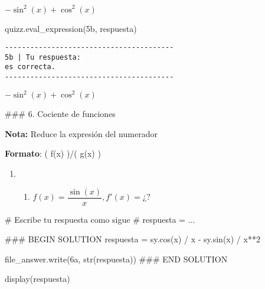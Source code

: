\documentclass[
  letterpaper,
  DIV=11,
  numbers=noendperiod]{scrreprt}
\newenvironment{Shaded}{\begin{snugshade}}{\end{snugshade}}
\newcommand{\BuiltInTok}[1]{\textcolor[rgb]{0.00,0.23,0.31}{#1}}
\newcommand{\CommentTok}[1]{\textcolor[rgb]{0.37,0.37,0.37}{#1}}
\newcommand{\DecValTok}[1]{\textcolor[rgb]{0.68,0.00,0.00}{#1}}
\newcommand{\NormalTok}[1]{\textcolor[rgb]{0.00,0.23,0.31}{#1}}
\newcommand{\OperatorTok}[1]{\textcolor[rgb]{0.37,0.37,0.37}{#1}}
\newcommand{\RegionMarkerTok}[1]{\textcolor[rgb]{0.00,0.23,0.31}{#1}}
\newcommand{\StringTok}[1]{\textcolor[rgb]{0.13,0.47,0.30}{#1}}
\providecommand{\tightlist}{%
  \setlength{\itemsep}{0pt}\setlength{\parskip}{0pt}}\usepackage{longtable,booktabs,array}
\begin{document}
$\displaystyle - \sin^{2}{\left(x \right)} + \cos^{2}{\left(x \right)}$

\begin{Shaded}
\begin{Highlighting}[]
\NormalTok{quizz.eval\_expression(}\StringTok{\textquotesingle{}5b\textquotesingle{}}\NormalTok{, respuesta)}
\end{Highlighting}
\end{Shaded}

\begin{verbatim}
----------------------------------------
5b | Tu respuesta:
es correcta.
----------------------------------------
\end{verbatim}

$\displaystyle - \sin^{2}{\left(x \right)} + \cos^{2}{\left(x \right)}$

\#\#\# 6. Cociente de funciones

\textbf{Nota:} Reduce la expresión del numerador

\textbf{Formato}: ( f(x) )/( g(x) )

\begin{enumerate}
\def\labelenumi{\arabic{enumi}.}
\setcounter{enumi}{5}
\tightlist
\item
  \begin{enumerate}
  \def\labelenumii{\alph{enumii}.}
  \tightlist
  \item
    \(f(x) = \dfrac{\sin(x)}{x}, f'(x) = ¿?\)
  \end{enumerate}
\end{enumerate}

\begin{Shaded}
\begin{Highlighting}[]
\CommentTok{\# Escribe tu respuesta como sigue }
\CommentTok{\# respuesta = ...}

\CommentTok{\#\#\# }\RegionMarkerTok{BEGIN}\CommentTok{ SOLUTION}
\NormalTok{respuesta }\OperatorTok{=}\NormalTok{ sy.cos(x) }\OperatorTok{/}\NormalTok{ x }\OperatorTok{{-}}\NormalTok{ sy.sin(x) }\OperatorTok{/}\NormalTok{ x}\OperatorTok{**}\DecValTok{2}

\NormalTok{file\_answer.write(}\StringTok{\textquotesingle{}6a\textquotesingle{}}\NormalTok{, }\BuiltInTok{str}\NormalTok{(respuesta))}
\CommentTok{\#\#\# }\RegionMarkerTok{END}\CommentTok{ SOLUTION}

\NormalTok{display(respuesta)}
\end{Highlighting}
\end{Shaded}
\end{document}
